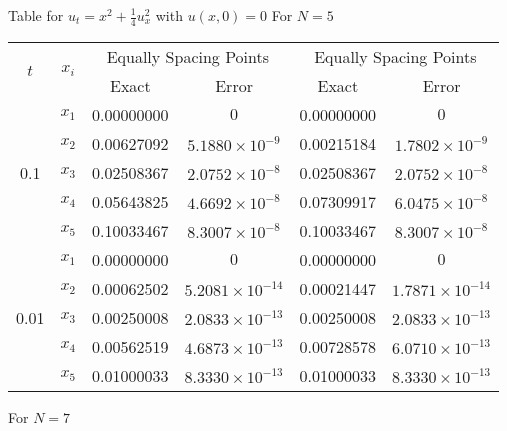 \documentclass[12pt, a4paper]{article}
\begin{document}
 Table for \( u_{t} = x^2 + \frac{1}{4} u_{x}^2 \) with \( u(x,0) = 0 \)
For \( N = 5 \)

\begin{table}[ht]
	\renewcommand{\arraystretch}{1.5}
	\centering
	\begin{tabular}{|c|c|c|c|c|c|}
		\hline
		\multirow{2}{*}{\( t \)} & \multirow{2}{*}{\( x_i \)} & \multicolumn{2}{c|}{Equally Spacing Points} & \multicolumn{2}{c|}{Equally Spacing Points} \\
		\cline{3-6}
		& & Exact & Error & Exact & Error \\
		\hline
		\multirow{5}{*}{0.1} & \( x_1 \) & 0.00000000 & \( 0 \) & 0.00000000 & \( 0 \) \\
		& \( x_2 \) & 0.00627092 & \( 5.1880 \times 10^{-9} \) & 0.00215184 & \( 1.7802 \times 10^{-9} \) \\
		& \( x_3 \) & 0.02508367 & \( 2.0752 \times 10^{-8} \) & 0.02508367 & \( 2.0752 \times 10^{-8} \) \\
		& \( x_4 \) & 0.05643825 & \( 4.6692 \times 10^{-8} \) & 0.07309917 & \( 6.0475 \times 10^{-8} \) \\
		& \( x_5 \) & 0.10033467 & \( 8.3007 \times 10^{-8} \) & 0.10033467 & \( 8.3007 \times 10^{-8} \) \\
		\hline
		\multirow{5}{*}{0.01} & \( x_1 \) & 0.00000000 & \( 0 \) & 0.00000000 & \( 0 \) \\
		& \( x_2 \) & 0.00062502 & \( 5.2081 \times 10^{-14} \) & 0.00021447 & \( 1.7871 \times 10^{-14} \) \\
		& \( x_3 \) & 0.00250008 & \( 2.0833 \times 10^{-13} \) & 0.00250008 & \( 2.0833 \times 10^{-13} \) \\
		& \( x_4 \) & 0.00562519 & \( 4.6873 \times 10^{-13} \) & 0.00728578 & \( 6.0710 \times 10^{-13} \) \\
		& \( x_5 \) & 0.01000033 & \( 8.3330 \times 10^{-13} \) & 0.01000033 & \( 8.3330 \times 10^{-13} \) \\
		\hline
	\end{tabular}
\end{table}

For \( N = 7 \)
\end{document}
